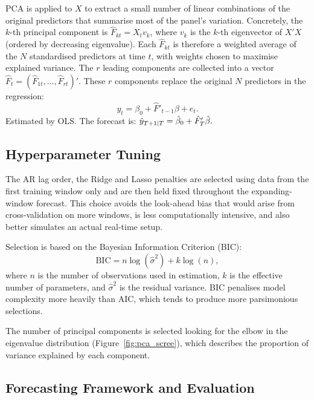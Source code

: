 \documentclass[12pt, a4paper]{article}
\begin{document}
PCA is applied to $X$ to extract a small number of linear combinations of the original predictors that summarise most of the panel's variation. Concretely, the $k$-th principal component is $\hat{F}_{kt} = X_t v_k$, where $v_k$ is the $k$-th eigenvector of $X'X$ (ordered by decreasing eigenvalue). Each $\hat{F}_{kt}$ is therefore a weighted average of the $N$ standardised predictors at time $t$, with weights chosen to maximise explained variance. The $r$ leading components are collected into a vector $\hat{F}_t = (\hat{F}_{1t}, \ldots, \hat{F}_{rt})'$.
 These $r$ components replace the original $N$ predictors in the regression:
\[
    y_t = \beta_0 + \hat{F}'_{t-1}\beta + e_t.
\]
Estimated by OLS. The forecast is:  $ \small \hat{y}_{T+1|T} = \hat{\beta}_0 + \hat{F}'_T\hat{\beta}.$

\subsection{Hyperparameter Tuning}
\label{sec:tuning}

The AR lag order, the Ridge and Lasso penalties are selected using data from the first training window only and are then held fixed throughout the expanding-window forecast. This choice avoids the look-ahead bias that would arise from cross-validation on more windows, is less computationally intensive, and also better simulates an actual real-time setup.

Selection is based on the Bayesian Information Criterion (BIC):
\[
    \mathrm{BIC} = n\log(\hat{\sigma}^2) + k\log(n),
\]
where $n$ is the number of observations used in estimation, $k$ is the effective number of parameters, and $\hat{\sigma}^2$ is the residual variance. BIC penalises model complexity more heavily than AIC, which tends to produce more parsimonious selections.

The number of principal components is selected looking for the elbow in the eigenvalue distribution (Figure~\ref{fig:pca_scree}), which describes the proportion of variance explained by each component.

\subsection{Forecasting Framework and Evaluation}
\label{sec:framework}
\end{document}
